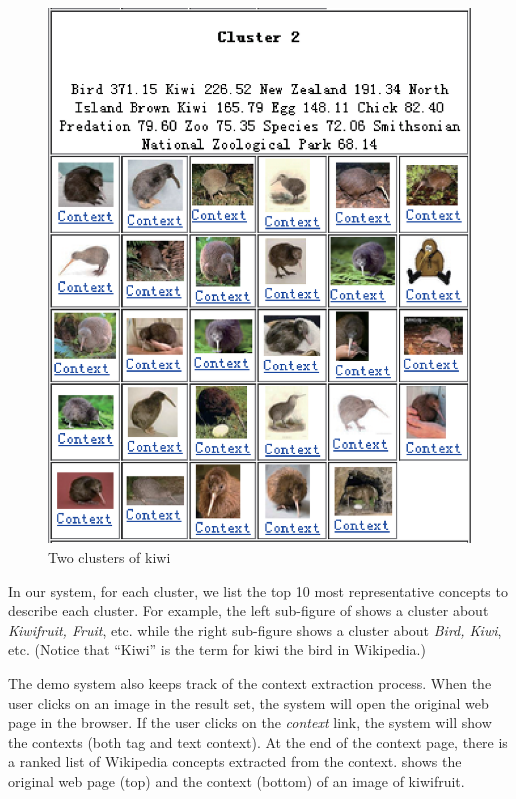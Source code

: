 \begin{figure}[th]
\begin{minipage}[t]{0.5\linewidth}
\includegraphics[width=0.98\columnwidth]{kiwi_bird.eps}
\end{minipage}
\caption{Two clusters of kiwi}
\label{fig:kiwi-cluster}
\end{figure}

In our system, for each cluster, we list the top 10 most
representative concepts to describe each cluster.
For example, the left sub-figure of 
shows a cluster about
\textit{Kiwifruit, Fruit}, etc. while the right sub-figure shows a cluster
about \textit{Bird, Kiwi}, etc. (Notice that ``Kiwi'' is the term for
kiwi the bird in Wikipedia.)

The demo system also keeps track of the context extraction process.
When the user clicks on an image in the result set,
the system will open the original web page in the browser.
If the user clicks on the \textit{context} link,
the system will show the contexts (both tag and text context).
At the end of the context page, there is a ranked list of
Wikipedia concepts extracted from the context.  shows
the original web page (top) and the context (bottom) of an image of kiwifruit.

